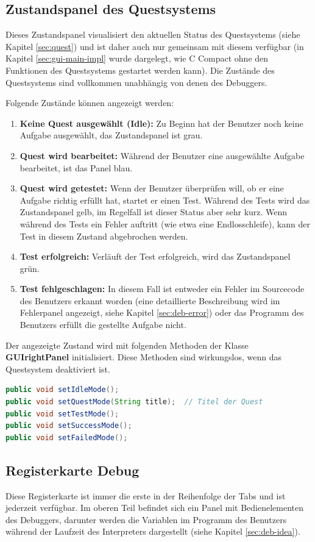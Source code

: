 \subsection{Zustandspanel des Questsystems}
Dieses Zustandspanel visualisiert den aktuellen Status des Questsystems (siehe Kapitel \ref{sec:quest}) und ist daher auch nur gemeinsam mit diesem verfügbar (in Kapitel \ref{sec:gui-main-impl} wurde dargelegt, wie C Compact ohne den Funktionen des Questsystems gestartet werden kann). Die Zustände des Questsystems sind vollkommen unabhängig von denen des Debuggers.

Folgende Zustände können angezeigt werden:
\begin{enumerate}
\item \textbf{Keine Quest ausgewählt (Idle):} Zu Beginn hat der Benutzer noch keine Aufgabe ausgewählt, das Zustandspanel ist grau.
\item \textbf{Quest wird bearbeitet:} Während der Benutzer eine ausgewählte Aufgabe bearbeitet, ist das Panel blau.
\item \textbf{Quest wird getestet:} Wenn der Benutzer überprüfen will, ob er eine Aufgabe richtig erfüllt hat, startet er einen Test. Während des Tests wird das Zustandspanel gelb, im Regelfall ist dieser Status aber sehr kurz. Wenn während des Tests ein Fehler auftritt (wie etwa eine Endlosschleife), kann der Test in diesem Zustand abgebrochen werden.
\item \textbf{Test erfolgreich:} Verläuft der Test erfolgreich, wird das Zustandspanel grün.
\item \textbf{Test fehlgeschlagen:} In diesem Fall ist entweder ein Fehler im Sourcecode des Benutzers erkannt worden (eine detaillierte Beschreibung wird im Fehlerpanel angezeigt, siehe Kapitel \ref{sec:deb-error}) oder das Programm des Benutzers erfüllt die gestellte Aufgabe nicht.
\end{enumerate}

Der angezeigte Zustand wird mit folgenden Methoden der Klasse \textbf{GUIrightPanel} initialisiert. Diese Methoden sind wirkungslos, wenn das Questsystem deaktiviert ist.
\begin{lstlisting}[language=JAVA]
public void setIdleMode();
public void setQuestMode(String title);  // Titel der Quest
public void setTestMode();
public void setSuccessMode();
public void setFailedMode();
\end{lstlisting}

\subsection{Registerkarte \glqq{}Debug\grqq{}}
\label{sec:gui-main-right-reg-deb}
Diese Registerkarte ist immer die erste in der Reihenfolge der Tabs und ist jederzeit verfügbar. Im oberen Teil befindet sich ein Panel mit Bedienelementen des Debuggers, darunter werden die Variablen im Programm des Benutzers während der Laufzeit des Interpreters dargestellt (siehe Kapitel \ref{sec:deb-idea}).

